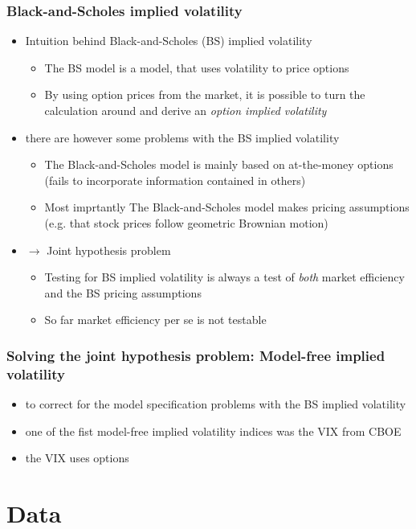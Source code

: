\documentclass[aspectratio=169]{beamer}
\begin{document}
\begin{frame}
\frametitle{Black-and-Scholes implied volatility}
	\begin{itemize}
	\item Intuition behind Black-and-Scholes (BS) implied volatility
	\begin{itemize}
	\item The BS model is a model, that uses volatility to price options
	\item By using option prices from the market, it is possible to turn the calculation around and derive an \textit{option implied volatility}
	\end{itemize}
	\item there are however some problems with the BS implied volatility
	\begin{itemize}
	\item The Black-and-Scholes model is mainly based on at-the-money options (fails to incorporate information contained in others)
	\item Most imprtantly The Black-and-Scholes model makes pricing assumptions (e.g. that stock prices follow geometric Brownian motion)
	\end{itemize}
	\item $\rightarrow$ Joint hypothesis problem
	\begin{itemize}
	\item Testing for BS implied volatility is always a test of \textit{both} market efficiency and the BS pricing assumptions
	\item So far market efficiency per se is not testable
	\end{itemize}
	\end{itemize}
\end{frame}

\begin{frame}
\frametitle{Solving the joint hypothesis problem: Model-free implied volatility}
	\begin{itemize}
	\item to correct for the model specification problems with the BS implied volatility 
	\item one of the fist model-free implied volatility indices was the VIX from CBOE
	\item the VIX uses options 
	\end{itemize}
\end{frame}

\section{Data}
\end{document}
